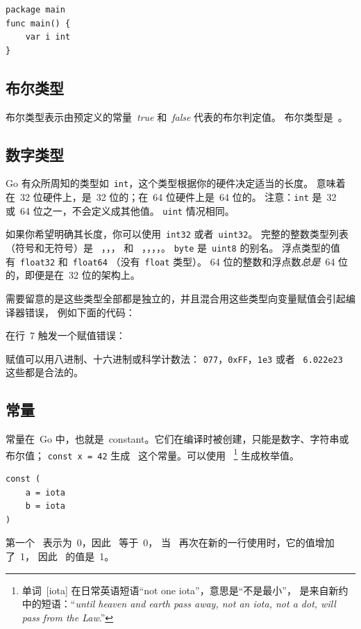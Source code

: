\begin{lstlisting}
package main
func main() { 
    var i int
}
\end{lstlisting}

\subsection{布尔类型}
布尔类型表示由预定义的常量~\emph{true} 和~\emph{false} 代表的布尔判定值。
布尔类型是~。

\subsection{数字类型}
Go 有众所周知的类型如~\lstinline{int}，这个类型根据你的硬件决定适当的长度。
意味着在~32 位硬件上，是~32 位的；在~64 位硬件上是~64 位的。
注意：\lstinline{int} 是~32 或~64 位之一，不会定义成其他值。
\lstinline{uint} 情况相同。

如果你希望明确其长度，你可以使用~\lstinline{int32} 或者~\lstinline{uint32}。
完整的整数类型列表（符号和无符号）是~
，，， 和~
，，，，。
\lstinline{byte} 是~\lstinline{uint8} 的别名。
浮点类型的值有~\lstinline{float32} 和~\lstinline{float64}
（没有~\lstinline{float} 类型）。 
64 位的整数和浮点数\emph{总是}~64 位的，即便是在~32 位的架构上。

需要留意的是这些类型全部都是独立的，并且混合用这些类型向变量赋值会引起编译器错误，
例如下面的代码：

在行~7 触发一个赋值错误：

\noindent{}

赋值可以用八进制、十六进制或科学计数法：
\lstinline{077}，\lstinline{0xFF}，\lstinline{1e3} 或者~
\mbox{\lstinline{6.022e23}} 这些都是合法的。

\subsection{常量}
\label{sec:constants}
常量在~Go 中，也就是~constant。它们在编译时被创建，只能是数字、字符串或布尔值；
\lstinline{const x = 42} 生成~ 这个常量。可以使用~
\footnote{单词~[iota] 在日常英语短语``not one iota''，意思是``不是最小''，
是来自新约中的短语：``\emph{until heaven and earth pass away, not an
iota, not a dot, will pass from the Law}.''\cite{iota}}
生成枚举值。
\begin{lstlisting}
const (
	a = iota
	b = iota 
)
\end{lstlisting}
第一个~ 表示为~0，因此~ 等于~0，
当~ 再次在新的一行使用时，它的值增加了~1，
因此~ 的值是~1。

